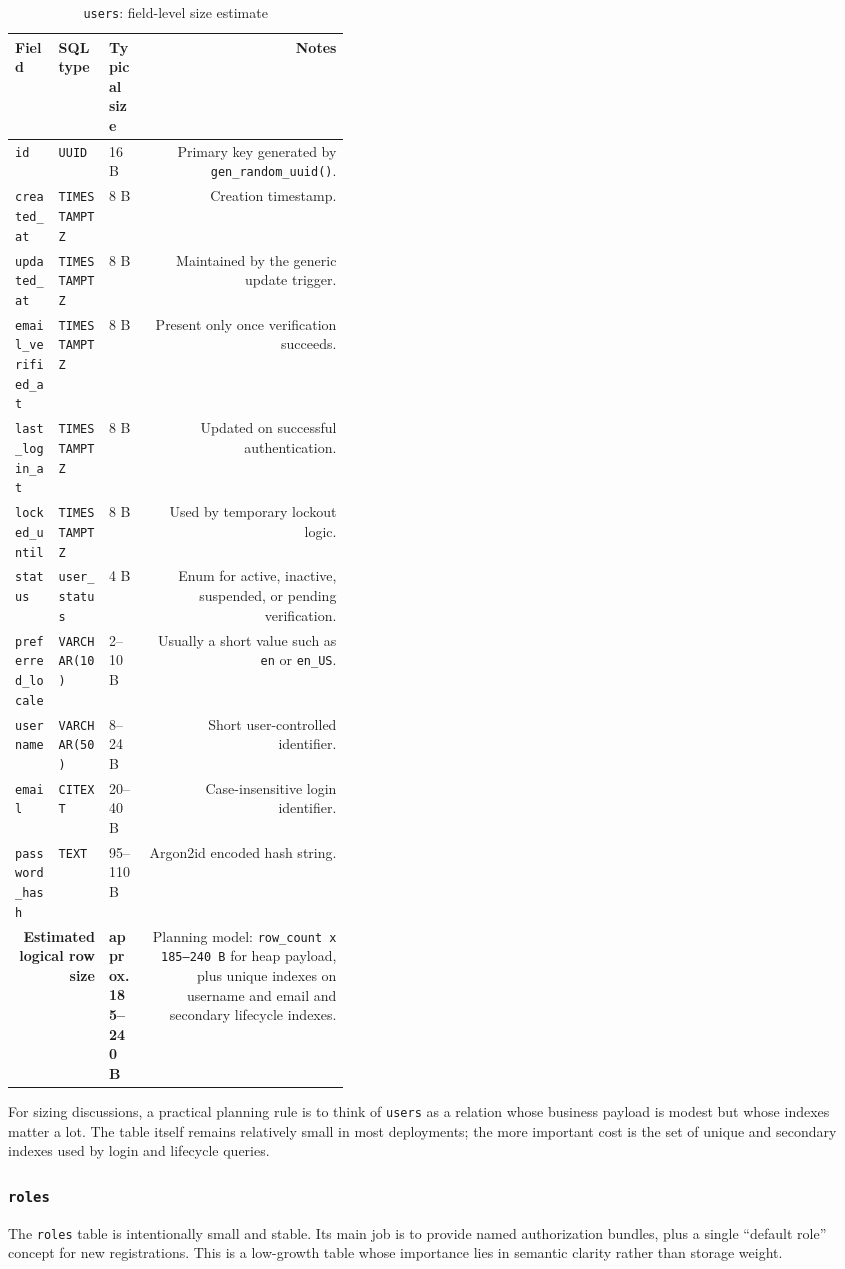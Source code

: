 \documentclass[11pt,a4paper]{article}
\newcommand{\dbfield}[4]{\texttt{#1} & \texttt{#2} & #3 & #4 \\}
\newcommand{\dbtotal}[2]{\midrule \multicolumn{2}{r}{\textbf{Estimated logical row size}} & \textbf{#1} & #2 \\}
\begin{document}
\begin{table}[H]
\centering
\scriptsize
\caption{\texttt{users}: field-level size estimate}
\begin{tabularx}{\linewidth}{T{0.13\linewidth} T{0.15\linewidth} C{0.11\linewidth} N}
\toprule
Field & SQL type & Typical size & Notes \\
\midrule
\dbfield{id}{UUID}{16 B}{Primary key generated by \texttt{gen\_random\_uuid()}.}
\dbfield{created\_at}{TIMESTAMPTZ}{8 B}{Creation timestamp.}
\dbfield{updated\_at}{TIMESTAMPTZ}{8 B}{Maintained by the generic update trigger.}
\dbfield{email\_verified\_at}{TIMESTAMPTZ}{8 B}{Present only once verification succeeds.}
\dbfield{last\_login\_at}{TIMESTAMPTZ}{8 B}{Updated on successful authentication.}
\dbfield{locked\_until}{TIMESTAMPTZ}{8 B}{Used by temporary lockout logic.}
\dbfield{status}{user\_status}{4 B}{Enum for active, inactive, suspended, or pending verification.}
\dbfield{preferred\_locale}{VARCHAR(10)}{2--10 B}{Usually a short value such as \texttt{en} or \texttt{en\_US}.}
\dbfield{username}{VARCHAR(50)}{8--24 B}{Short user-controlled identifier.}
\dbfield{email}{CITEXT}{20--40 B}{Case-insensitive login identifier.}
\dbfield{password\_hash}{TEXT}{95--110 B}{Argon2id encoded hash string.}
\dbtotal{approx. 185--240 B}{Planning model: \texttt{row\_count x 185--240 B} for heap payload, plus unique indexes on username and email and secondary lifecycle indexes.}
\bottomrule
\end{tabularx}
\end{table}

For sizing discussions, a practical planning rule is to think of \texttt{users} as a relation whose business payload is modest but whose indexes matter a lot. The table itself remains relatively small in most deployments; the more important cost is the set of unique and secondary indexes used by login and lifecycle queries.

\subsubsection{\texttt{roles}}

The \texttt{roles} table is intentionally small and stable. Its main job is to provide named authorization bundles, plus a single ``default role'' concept for new registrations. This is a low-growth table whose importance lies in semantic clarity rather than storage weight.
\end{document}
